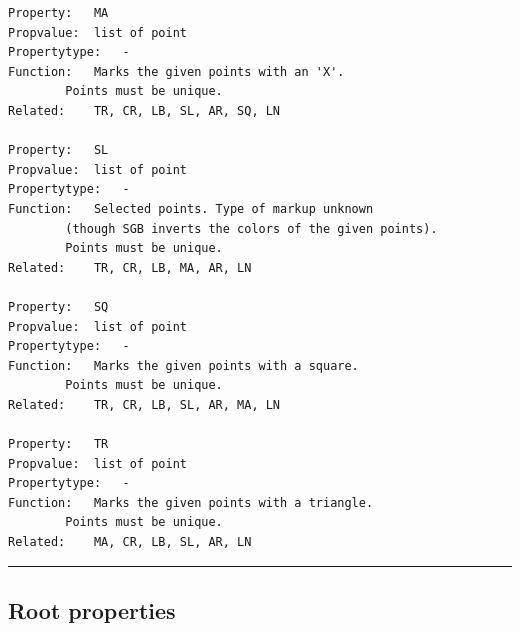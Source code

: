 \begin{verbatim}
Property:   MA
Propvalue:  list of point
Propertytype:   -
Function:   Marks the given points with an 'X'.
        Points must be unique.
Related:    TR, CR, LB, SL, AR, SQ, LN

Property:   SL
Propvalue:  list of point
Propertytype:   -
Function:   Selected points. Type of markup unknown
        (though SGB inverts the colors of the given points).
        Points must be unique.
Related:    TR, CR, LB, MA, AR, LN

Property:   SQ
Propvalue:  list of point
Propertytype:   -
Function:   Marks the given points with a square.
        Points must be unique.
Related:    TR, CR, LB, SL, AR, MA, LN

Property:   TR
Propvalue:  list of point
Propertytype:   -
Function:   Marks the given points with a triangle.
        Points must be unique.
Related:    MA, CR, LB, SL, AR, LN
\end{verbatim}

\begin{center}\rule{0.5\linewidth}{0.5pt}\end{center}

\subsection{Root properties}\label{root-properties}

